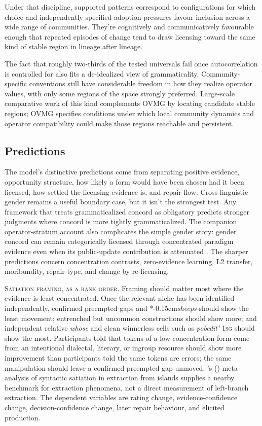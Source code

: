 \documentclass[12pt,letterpaper]{article}
\newcommand{\mention}[1]{\textit{#1}}
\newcommand{\abbr}[1]{\textsc{#1}}
\newcommand{\judgesep}{\kern-0.15em}
\newcommand{\ungram}[1]{*\judgesep#1}
\newcommand{\posscite}[1]{\citeauthor{#1}'s (\citeyear{#1})}
\begin{document}
Under that discipline, supported patterns correspond to configurations for which
choice and independently specified adoption pressures favour inclusion across a
wide range of communities. They're cognitively and communicatively favourable
enough that repeated episodes of change tend to draw licensing toward the same
kind of stable region in lineage after lineage.

The fact that roughly two-thirds of the tested universals fail once
autocorrelation is controlled for also fits a de-idealized view of
grammaticality. Community-specific conventions still have considerable freedom
in how they realize operator values, with only some regions of the space strongly
preferred. Large-scale comparative work of this kind complements OVMG by
locating candidate stable regions; OVMG specifies conditions under which local
community dynamics and operator compatibility could make those regions
reachable and persistent.

\subsection{Predictions}
\label{sec:predictions}

The model's distinctive predictions come from separating positive evidence,
opportunity structure, how likely a form would have been chosen had it been
licensed, how settled the licensing evidence is, and repair flow.
Cross-linguistic gender remains a useful boundary
case, but it isn't the strongest test. Any framework that treats
grammaticalized concord as obligatory predicts stronger judgments where concord
is more tightly grammaticalized. The companion operator-stratum account also
complicates the simple gender story: gender concord can remain categorically
licensed through concentrated paradigm evidence even when its public-update
contribution is attenuated \autocite{reynolds2026operators}. The sharper
predictions concern concentration contrasts, zero-evidence learning, L2
transfer, moribundity, repair type, and change by re-licensing.

\noindent\textsc{Satiation framing, as a rank order.} Framing should matter most
where the evidence is least concentrated. Once the relevant niche has been
identified independently, confirmed preempted gaps and
\ungram{\mention{sheeps}} should show the least movement; entrenched but uncommon
constructions should show more; and independent relative \mention{whose} and
clean winnerless cells such as \mention{pobedit'} \abbr{1sg} should show the
most. Participants told that tokens of a
low-concentration form come from an intentional dialectal, literary, or ingroup
resource should show more improvement than participants told the same tokens are
errors; the same manipulation should leave a confirmed preempted gap unmoved.
\posscite{Lu2024} meta-analysis of syntactic satiation in extraction from
islands supplies a nearby benchmark for extraction phenomena, not a direct
measurement of left-branch extraction.
The dependent variables are rating change, evidence-confidence change,
decision-confidence change, later repair behaviour, and elicited production.
\end{document}
